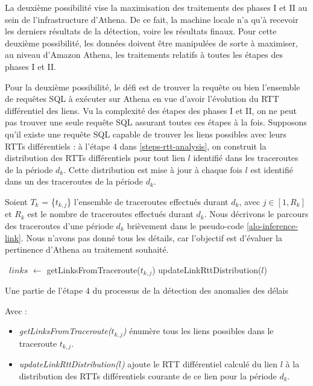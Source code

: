 La deuxième possibilité vise la maximisation des traitements des  phases I et II au sein de l'infrastructure  d'Athena. De ce fait, la machine locale n'a qu'à recevoir les derniers résultats de la détection, voire les résultats finaux. Pour cette deuxième possibilité, les données doivent être manipulées de sorte à maximiser,  	au niveau d'Amazon Athena,  les traitements relatifs à toutes les étapes des  phases I et II. 

Pour la deuxième possibilité, le défi est de trouver la requête ou bien l'ensemble de requêtes SQL à exécuter sur Athena en vue d'avoir l'évolution du RTT différentiel des liens. 
Vu la complexité des  étapes des phases I et II, on ne peut pas trouver une seule requête SQL assurant toutes ces étapes à la fois. Supposons qu'il existe une requête SQL capable de trouver les liens possibles avec leurs RTTs différentiels : à l'étape $ 4 $ dans \ref{steps-rtt-analysis}, on construit la distribution des RTTs différentiels pour tout lien $l$ identifié dans les traceroutes de la période $d_k$. Cette distribution est mise à jour à chaque fois $l$ est identifié dans un des traceroutes  de la période $d_k$. 

Soient  $T_k$ = \{$t_{k, j}$\}  l'ensemble de traceroutes effectués durant $d_k$, avec $j \in [1, R_k]$ et $R_k$ est le nombre de traceroutes effectués durant $d_k$. Nous décrivons le parcours des traceroutes d'une période $d_k$ brièvement dans le pseudo-code \ref{alo-inference-link}. Nous n'avons pas donné  tous les détails, car l'objectif est d'évaluer la pertinence d'Athena au traitement souhaité.
\begin{algorithm}[H]
	\begin{algorithmic}[1]
		 \
		\State $links$ $\leftarrow$ getLinksFromTraceroute($t_{k, j}$)
		\State updateLinkRttDistribution($l$) \label{update-link}
		\EndFor
		\EndFor
	\end{algorithmic}
	\caption{Une partie de l'étape $4$ du processus de la détection des anomalies des délais }
	\label{alo-inference-link}
\end{algorithm}

Avec : 
\begin{itemize}
	\item \textit{getLinksFromTraceroute($t_{k, j}$)} énumère tous les liens possibles dans le traceroute $t_{k, j}$.
	
	\item \textit{updateLinkRttDistribution($l$)} ajoute le RTT différentiel calculé du lien $l$ à la distribution des RTTs différentiels courante de ce lien pour la période $d_k$.
\end{itemize}


